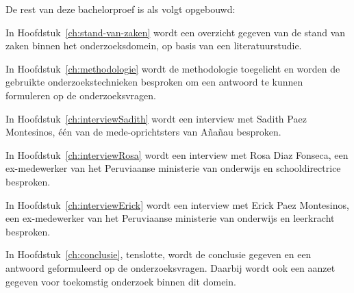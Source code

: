 
De rest van deze bachelorproef is als volgt opgebouwd:

In Hoofdstuk~\ref{ch:stand-van-zaken} wordt een overzicht gegeven van de stand van zaken binnen het onderzoeksdomein, op basis van een literatuurstudie.

In Hoofdstuk~\ref{ch:methodologie} wordt de methodologie toegelicht en worden de gebruikte onderzoekstechnieken besproken om een antwoord te kunnen formuleren op de onderzoeksvragen.

In Hoofdstuk~\ref{ch:interviewSadith} wordt een interview met Sadith Paez Montesinos, één van de mede-oprichtsters van Añañau besproken.

In Hoofdstuk~\ref{ch:interviewRosa} wordt een interview met Rosa Diaz Fonseca, een ex-medewerker van het Peruviaanse ministerie van onderwijs en schooldirectrice besproken.

In Hoofdstuk~\ref{ch:interviewErick} wordt een interview met Erick Paez Montesinos, een ex-medewerker van het Peruviaanse ministerie van onderwijs en leerkracht besproken.

In Hoofdstuk~\ref{ch:conclusie}, tenslotte, wordt de conclusie gegeven en een antwoord geformuleerd op de onderzoeksvragen. Daarbij wordt ook een aanzet gegeven voor toekomstig onderzoek binnen dit domein.